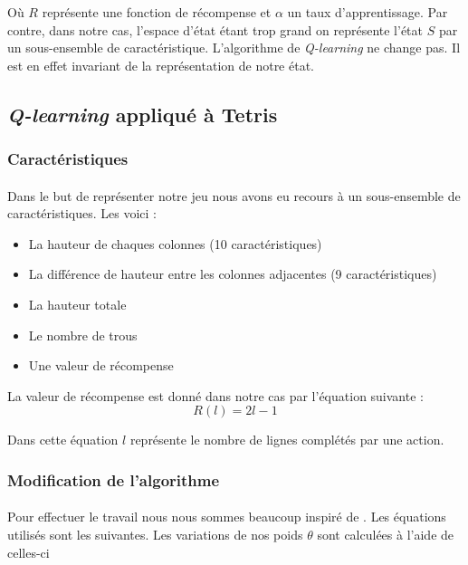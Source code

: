 \documentclass[a4paper, 12pt]{article} %
\begin{document}
	Où $R$ représente une fonction de récompense et $\alpha$ un taux d'apprentissage. Par contre, dans notre cas,
	l'espace d'état étant trop grand on représente l'état $S$ par un sous-ensemble de caractéristique. L'algorithme
	de \textit{Q-learning} ne change pas. Il est en effet invariant de la représentation de notre état. 

    \subsection{\textit{Q-learning} appliqué à Tetris}
    	\subsubsection{Caractéristiques}
    	    \paragraph{}
	    Dans le but de représenter notre jeu nous avons eu recours à un sous-ensemble de caractéristiques. Les voici :
	    \begin{itemize}
	    	\item La hauteur de chaques colonnes (10 caractéristiques)
		\item La différence de hauteur entre les colonnes adjacentes (9 caractéristiques)
		\item La hauteur totale
		\item Le nombre de trous 
		\item Une valeur de récompense
	    \end{itemize}

	    La valeur de récompense est donné dans notre cas par l'équation suivante :
	    \begin{equation}
	    \label{recompense}
	    	R(l) = 2l - 1
	    \end{equation}
	    
	    Dans cette équation $l$ représente le nombre de lignes complétés par une action.

	\subsubsection{Modification de l'algorithme}
    	    \paragraph{}
	    Pour effectuer le travail nous nous sommes beaucoup inspiré de \cite{tetris}. Les équations utilisés sont les 
	    suivantes. Les variations de nos poids $\theta$ sont calculées à l'aide de celles-ci
\end{document}
